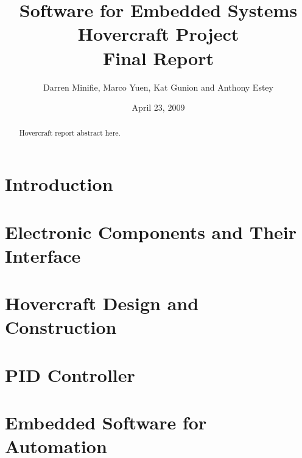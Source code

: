 \documentclass{article}
\begin{document}
\lstset{captionpos=b,
        breaklines=true,
        frame=single,
        showstringspaces=false,
        basicstyle=\footnotesize,
        numberstyle=\tiny,
        tabsize=2,
        language=C,
        numbers=left,
        stepnumber=2,
        numbersep=5pt,
        commentstyle=\textit}



\title{Software for Embedded Systems\\Hovercraft Project\\Final Report}


\author{Darren Minifie, Marco Yuen, Kat Gunion and Anthony Estey}

\date{April 23, 2009}
\maketitle
\begin{abstract}
Hovercraft report abstract here.
\end{abstract}

\tableofcontents
\listoffigures
\listoftables
\newpage





\section{Introduction}

\clearpage
\section{Electronic Components and Their Interface}

\clearpage
\section{Hovercraft Design and Construction}

\clearpage
\section{PID Controller}

\clearpage
\section{Embedded Software for Automation}
\label{embeddedSoftwareAutomation}

\clearpage
\end{document}
